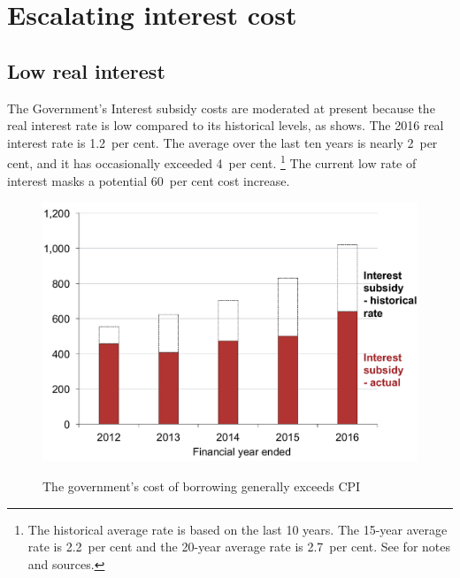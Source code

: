 \documentclass{grattan}
\begin{document}
\section{Escalating interest cost}\label{escalating-interest-cost}

\subsection{Low real interest}\label{low-real-interest}

The Government's \gls{Interest subsidy} costs are moderated at present because the real interest rate is low compared to its historical levels, as  shows.
The 2016 real interest rate is 1.2~per cent.
The average over the last ten years is nearly 2~per cent, and it has occasionally exceeded 4~per cent.%
   \footnote{The historical average rate is based on the last 10 years.
The 15-year average rate is 2.2~per cent and the 20-year average rate is 2.7~per cent. See   for notes and sources.
} The current low rate of interest masks a potential 60~per cent cost increase.

\begin{figure}[t]\vspace{1pt}
\caption[The government's cost of borrowing generally exceeds CPI]{The government's cost of borrowing generally exceeds \gls{CPI}}\label{fig:fig2-governments-cost-of-borrowing-exceeds-CPI}

\includegraphics[page=2]{atlas/Chartpack.pdf}

%
{\textcites{ABS2016ConsumerPriceIndex}{RBA-2015-f2Capitalmarketyields}{RBA2016F21Capitalmarket}}
\end{figure}
\end{document}
